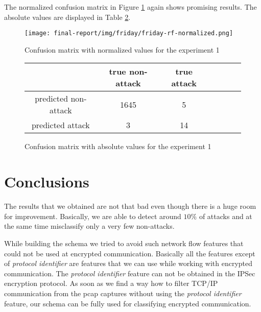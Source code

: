 \documentclass{article}
\begin{document}
The normalized confusion matrix in Figure \ref{fig-thursday-rf-normalized} again shows promising results. The absolute values are displayed in Table \ref{tab-thursday-rf-absolute}.

\begin{figure}[h!]
    \centering
    \texttt{[image: final-report/img/friday/friday-rf-normalized.png]}
    \caption{Confusion matrix with normalized values for the experiment 1}
    \label{fig-thursday-rf-normalized}
\end{figure}

\begin{figure}[h!]
\centering
\begin{tabular}{ |c|c|c|c|c|c|c| }
 \hline
  & true non-attack & true attack \\
 \hline
 predicted non-attack & 1645 & 5 \\
 \hline
 predicted attack & 3 & 14 \\
 \hline
\end{tabular}
\caption{Confusion matrix with absolute values for the experiment 1}
\label{tab-thursday-rf-absolute}
\end{figure}




\clearpage
\section{Conclusions}
The results that we obtained are not that bad even though there is a huge room for improvement. Basically, we are able to detect around $10\%$ of attacks and at the same time misclassify only a very few non-attacks.

While building the schema we tried to avoid such network flow features that could not be used at encrypted communication. Basically all the features except of \textit{protocol identifier} are features that we can use while working with encrypted communication. The \textit{protocol identifier} feature can not be obtained in the IPSec encryption protocol. As soon as we find a way how to filter TCP/IP communication from the pcap captures without using the \textit{protocol identifier} feature, our schema can be fully used for classifying encrypted communication.



\clearpage




% 

\end{document}
